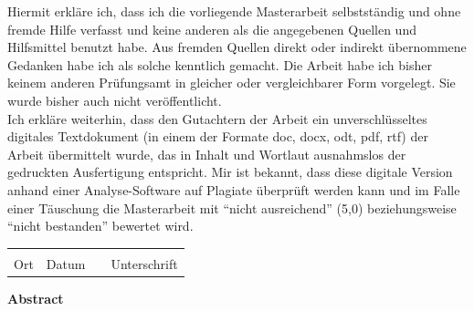 \documentclass[oneside,12pt]{report}
\begin{document}
Hiermit erkläre ich, dass ich die vorliegende Masterarbeit selbstständig und ohne fremde Hilfe verfasst und keine anderen als die angegebenen Quellen und Hilfsmittel benutzt habe. Aus fremden Quellen direkt oder indirekt übernommene Gedanken habe ich als solche kenntlich gemacht. Die Arbeit habe ich bisher keinem anderen Prüfungsamt in gleicher oder vergleichbarer Form vorgelegt. Sie wurde bisher auch nicht veröffentlicht.\\[2cm]
Ich erkläre weiterhin, dass den Gutachtern der Arbeit ein unverschlüsseltes digitales Textdokument (in einem der Formate doc, docx, odt, pdf, rtf) der Arbeit übermittelt wurde, das in Inhalt und Wortlaut ausnahmslos der gedruckten Ausfertigung entspricht. Mir ist bekannt, dass diese digitale Version anhand einer Analyse-Software auf Plagiate überprüft werden kann und im Falle einer Täuschung die Masterarbeit mit “nicht ausreichend” (5,0) beziehungsweise “nicht bestanden” bewertet wird.\\[2cm]
\begin{tabular}{ p{3cm}p{3cm}p{1cm}p{5cm} }
    \hrulefill & \hrulefill & & \hrulefill\\
    Ort & Datum & & Unterschrift
\end{tabular}

\newpage

\vspace*{3cm} 
\begin{center}
    \textbf{Abstract}
\end{center}

\varabstract

\newpage

\tableofcontents

\newpage
\hypersetup{pageanchor=true}



\clearpage
	
\end{document}

